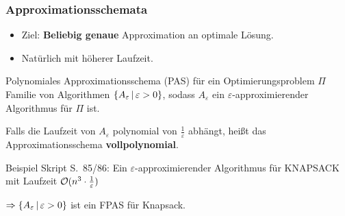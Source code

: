 \begin{frame}
	\frametitle{Approximationsschemata}
	
	\begin{itemize}
		\item Ziel: \textbf{Beliebig genaue} Approximation an optimale Lösung.
		\item Natürlich mit höherer Laufzeit.
	\end{itemize}
	
	\pause
	
	\begin{block}{Polynomiales Approximationsschema (PAS) für ein Optimierungsproblem $\Pi$}
		Familie von Algorithmen $\left\lbrace A_\varepsilon \,\middle\vert\, \varepsilon > 0 \right\rbrace$, sodass $A_\varepsilon$ ein $\varepsilon$-approximierender Algorithmus für $\Pi$ ist. \micropause
		
		Falls die Laufzeit von $A_\varepsilon$ polynomial von $\frac{1}{\varepsilon}$ abhängt, heißt das Approximationsschema \textbf{vollpolynomial}.
	\end{block}
	
	\pause
	
	\begin{block}{Beispiel}
		Skript S.\ 85/86: Ein $\varepsilon$-approximierender Algorithmus für KNAPSACK mit Laufzeit $\mathcal{O}(n^3 \cdot \frac{1}{\varepsilon})$ \micropause
		
		$\Rightarrow \left\lbrace A_\varepsilon \,\middle\vert\, \varepsilon > 0 \right\rbrace$ ist ein FPAS für Knapsack.
	\end{block}
\end{frame}


